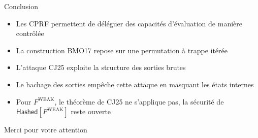 \documentclass{beamer}
\begin{document}
\begin{frame}{Conclusion}

\begin{itemize}
    \item Les CPRF permettent de déléguer des capacités d'évaluation de manière contrôlée

    \vspace{0.2cm}

    \item La construction BMO17 repose sur une permutation à trappe itérée

    \vspace{0.2cm}

    \item L'attaque CJ25 exploite la structure des sorties brutes

    \vspace{0.2cm}

    \item Le hachage des sorties empêche cette attaque en masquant les états internes

    \vspace{0.2cm}

    \item Pour $F^{\mathrm{WEAK}}$, le théorème de CJ25 ne s'applique pas,
    la sécurité de $\mathsf{Hashed}[F^{\mathrm{WEAK}}]$ reste ouverte
\end{itemize}

\vspace{0.6cm}

\begin{center}
\Large Merci pour votre attention
\end{center}

\end{frame}
\end{document}
